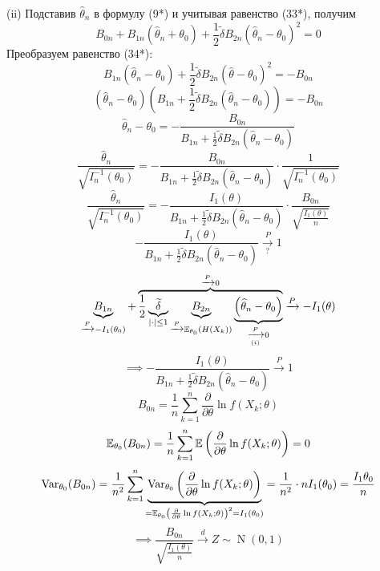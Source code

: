 {    (ii) Подставив $\widehat{\theta}_n$ в формулу (9*) и учитывая равенство (33*), получим
    \[B_{0n} + B_{1n}\left(\widehat{\theta}_n + \theta_0\right) + \frac{1}{2}\widetilde{\delta}B_{2n}\left(\widehat{\theta}_n - \theta_0\right)^2 = 0 \tag{34*}\]
    Преобразуем равенство (34*):
    \[B_{1n}\left(\widehat{\theta}_n - \theta_0\right) + \frac{1}{2}\widetilde{\delta}B_{2n}\left(\widehat{\theta} - \theta_0\right)^2 = -B_{0n}\]
    \[\left(\widehat{\theta}_n - \theta_0\right)\left(B_{1n} + \frac{1}{2}\widetilde{\delta}B_{2n}\left(\widehat{\theta}_n - \theta_0\right)\right) = -B_{0n}\]
    \[\widehat{\theta}_n - \theta_0 = -\frac{B_{0n}}{B_{1n} + \frac{1}{2}\widetilde{\delta}B_{2n}\left(\widehat{\theta}_n - \theta_0\right)}\]
    \[\frac{\widehat{\theta}_n}{\sqrt{I_n^{-1}(\theta_0)}} = -\frac{B_{0n}}{B_{1n} + \frac{1}{2}\widetilde{\delta}B_{2n}\left(\widehat{\theta}_n - \theta_0\right)} \cdot \frac{1}{\sqrt{I_n^{-1}(\theta_0)}}\]
    \[\frac{\widehat{\theta}_n}{\sqrt{I_n^{-1}(\theta_0)}} = -\frac{I_1(\theta)}{B_{1n} + \frac{1}{2}\widetilde{\delta}B_{2n}\left(\widehat{\theta}_n - \theta_0\right)} \cdot \frac{B_{0n}}{\sqrt{\frac{I_1(\theta)}{n}}} \tag{35*}\]
    \[-\frac{I_1(\theta)}{B_{1n} + \frac{1}{2}\widetilde{\delta}B_{2n}\left(\widehat{\theta}_n - \theta_0\right)} \xrightarrow[?]{P} 1\]
    \[\underbrace{B_{1n}}_{\xrightarrow{P}-I_1(\theta_0)} + \overbrace{\frac{1}{2}\underbrace{\widetilde{\delta}}_{|\cdot|\leq 1}\underbrace{B_{2n}}_{\xrightarrow{P}\mathbb{E}_{\theta_0}(H(X_k))}\underbrace{\left(\widehat{\theta}_n - \theta_0\right)}_{\xrightarrow[(i)]{P} 0}}^{\xrightarrow{P} 0} \xrightarrow{P} -I_1(\theta)\]
    \[\implies -\frac{I_1(\theta)}{B_{1n} + \frac{1}{2}\widetilde{\delta}B_{2n}\left(\widehat{\theta}_n - \theta_0\right)} \xrightarrow{P} 1\]
    \[B_{0n} = \frac{1}{n}\sum_{k=1}^{n}\frac{\partial}{\partial \theta}\ln f(X_k;\theta)\]
    \[\mathbb{E}_{\theta_0}(B_{0n}) = \frac{1}{n}\sum_{k=1}^{n}\mathbb{E}\left(\frac{\partial}{\partial \theta}\ln f(X_k;\theta)\right) = 0\]
    \[\operatorname{Var}_{\theta_0}(B_{0n}) = \frac{1}{n^2}\sum_{k=1}^{n}\underbrace{\operatorname{Var}_{\theta_0}\left(\frac{\partial}{\partial \theta}\ln f(X_k;\theta)\right)}_{=\mathbb{E}_{\theta_0}\left(\frac{\partial}{\partial \theta}\ln f(X_k;\theta)\right)^2 = I_1(\theta_0)} = \frac{1}{n^2} \cdot nI_1(\theta_0) = \frac{I_1{\theta_0}}{n}\]
    \[\implies \frac{B_{0n}}{\sqrt{\frac{I_1(\theta)}{n}}} \xrightarrow{d} Z \sim \operatorname{N}(0, 1)\]
}

\setcounter{maindf}{10}
\setcounter{subdf}{0}

\setcounter{mainth}{10}
\setcounter{subth}{0}

